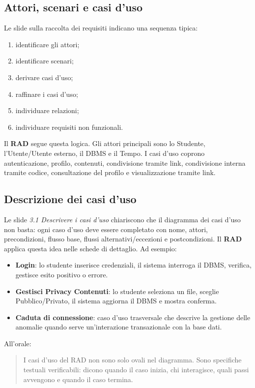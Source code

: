 ﻿\documentclass[11pt,a4paper]{article}
\newcommand{\doc}[1]{\textbf{#1}}
\newcommand{\slide}[1]{\emph{#1}}
\newcommand{\term}[1]{\textbf{#1}}
\begin{document}
\subsection{Attori, scenari e casi d'uso}

Le slide sulla raccolta dei requisiti indicano una sequenza tipica:
\begin{enumerate}
  \item identificare gli attori;
  \item identificare scenari;
  \item derivare casi d'uso;
  \item raffinare i casi d'uso;
  \item individuare relazioni;
  \item individuare requisiti non funzionali.
\end{enumerate}

Il \doc{RAD} segue questa logica. Gli attori principali sono lo Studente, l'Utente/Utente
esterno, il DBMS e il Tempo. I casi d'uso coprono autenticazione, profilo, contenuti,
condivisione tramite link, condivisione interna tramite codice, consultazione del profilo
e visualizzazione tramite link.

\subsection{Descrizione dei casi d'uso}

Le slide \slide{3.1 Descrivere i casi d'uso} chiariscono che il diagramma dei casi d'uso non
basta: ogni caso d'uso deve essere completato con nome, attori, precondizioni,
flusso base, flussi alternativi/eccezioni e postcondizioni. Il \doc{RAD} applica questa idea
nelle schede di dettaglio. Ad esempio:
\begin{itemize}
  \item \term{Login}: lo studente inserisce credenziali, il sistema interroga il DBMS,
  verifica, gestisce esito positivo o errore.
  \item \term{Gestisci Privacy Contenuti}: lo studente seleziona un file, sceglie
  Pubblico/Privato, il sistema aggiorna il DBMS e mostra conferma.
  \item \term{Caduta di connessione}: caso d'uso trasversale che descrive la gestione
  delle anomalie quando serve un'interazione transazionale con la base dati.
\end{itemize}

All'orale:
\begin{quote}
I casi d'uso del RAD non sono solo ovali nel diagramma. Sono specifiche testuali
verificabili: dicono quando il caso inizia, chi interagisce, quali passi avvengono e
quando il caso termina.
\end{quote}
\end{document}
